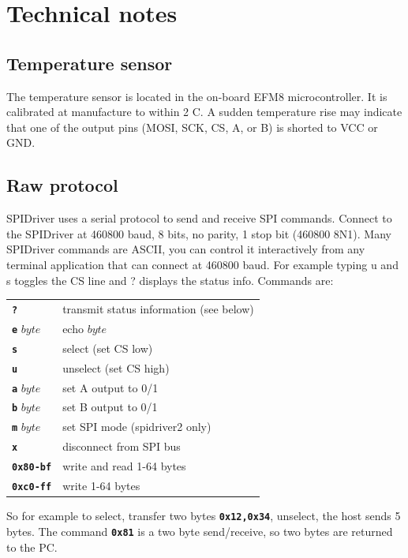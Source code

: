 \documentclass{article}
\newcommand{\mach}[1]{\texttt{\textbf{#1}}}
\newcommand{\gap}{\vspace{10pt}}
\begin{document}
\newpage
\section{Technical notes}



\subsection{Temperature sensor}

The temperature sensor is located in the on-board EFM8 microcontroller.
It is calibrated at manufacture to within 2 C.
A sudden temperature rise may indicate that one of the output pins (MOSI, SCK, CS, A, or B) is shorted to VCC or GND.

\subsection{Raw protocol}

SPIDriver uses a serial protocol to send and receive SPI commands.
Connect to the SPIDriver at 460800 baud, 8 bits, no parity, 1 stop bit (460800 8N1).
Many SPIDriver commands are ASCII, you can control it
interactively from any terminal application that can connect at 460800
baud. For example typing u and s toggles the CS line and ? displays the
status info.
Commands are:

\gap\begin{tabular}{ll}
\hline
\mach{?}        & transmit status information (see below)        \\
\mach{e} $byte$ & echo $byte$       \\
\mach{s}        & select (set CS low) \\
\mach{u}        & unselect (set CS high)        \\
\mach{a} $byte$ & set A output to 0/1       \\
\mach{b} $byte$ & set B output to 0/1       \\
\mach{m} $byte$ & set SPI mode (spidriver2 only) \index{mode!SPI}\\
\mach{x}        & disconnect from SPI bus       \\
\mach{0x80-bf}  & write and read 1-64 bytes       \\
\mach{0xc0-ff}  & write 1-64 bytes        \\ \hline
\end{tabular}\gap

So for example to select, transfer two bytes
\mach{0x12,0x34},
unselect, the host sends 5 bytes.
The command \mach{0x81} is a two byte send/receive, so two bytes are returned to the PC.
\end{document}
